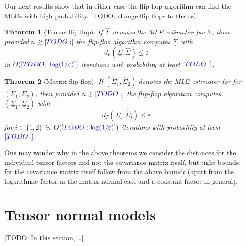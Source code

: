 \documentclass{article}
\newtheorem{theorem}{Theorem}
\newcommand\eps{\varepsilon}
\newcommand{\TODO}[1]{{\color{blue}[TODO: #1]}}
\begin{document}
Our next results show that in either case the flip-flop algorithm can find the MLEs with high probability. \TODO{change flip flops to thetas}

\begin{theorem}[Tensor flip-flop]\label{thm:tensor-flipflop} If $\hat{\Sigma}$ denotes the MLE estimator for $\Sigma$, then provided $n \geq \TODO{}$ the flip-flop algorithm computes $\underline{\Sigma}$ with
$$ d_F(\underline{\Sigma}, \hat{\Sigma}) \leq \eps $$
in $O(\TODO{\log(1/\eps)})$ iterations with probability at least $\TODO{}$.
\end{theorem}

\begin{theorem}[Matrix flip-flop]\label{thm:matrix-flipflop} If $(\hat{\Sigma}_1, \hat{\Sigma}_2) $ denotes the MLE estimator for for $(\Sigma_1, \Sigma_2)$, then provided $n \geq \TODO{}$ the flip-flop algorithm computes $(\underline{\Sigma}_1, \underline{\Sigma}_2)$ with
$$ d_F(\underline{\Sigma}_i, \hat{\Sigma}_i) \leq \eps $$
for $i \in \{1,2\}$ in $O(\TODO{\log(1/\eps)})$ iterations with probability at least $\TODO{}$.
\end{theorem}

One may wonder why in the above theorems we consider the distances for the individual tensor factors and not the covariance matrix itself, but tight bounds for the covariance matrix itself follow from the above bounds (apart from the logarithmic factor in the matrix normal case and a constant factor in general).

\section{Tensor normal models}
\TODO{In this section, \dots}

\end{document}
